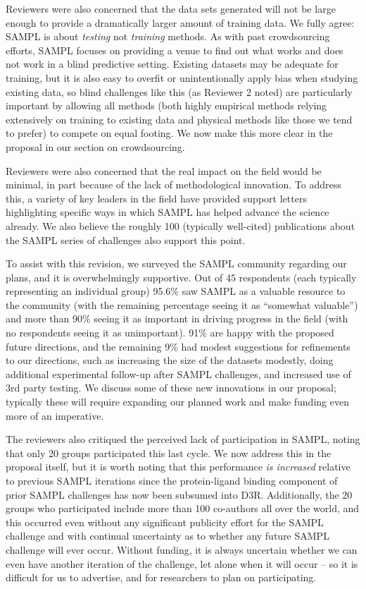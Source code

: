 \documentclass[11pt]{article}
\begin{document}
Reviewers were also concerned that the data sets generated will not be large enough to provide a dramatically larger amount of training data. 
We fully agree: SAMPL is about \emph{testing} not \emph{training} methods.
As with past crowdsourcing efforts, SAMPL focuses on providing a venue to find out what works and does not work in a blind predictive setting.
Existing datasets may be adequate for training, but it is also easy to overfit or unintentionally apply bias when studying existing data, so blind challenges like this (as Reviewer 2 noted) are particularly important by allowing all methods (both highly empirical methods relying extensively on training to existing data and physical methods like those we tend to prefer) to compete on equal footing.
We now make this more clear in the proposal in our section %
on crowdsourcing.

Reviewers were also concerned that the real impact on the field would be minimal, in part because of the lack of methodological innovation.
To address this, a variety of key leaders in the field have provided support letters highlighting specific ways in which SAMPL has helped advance the science already. 
We also believe the roughly 100 (typically well-cited) publications about the SAMPL series of challenges also support this point.

To assist with this revision, we surveyed the SAMPL community regarding our plans, and it is overwhelmingly supportive. 
Out of 45 respondents (each typically representing an individual group) 95.6\% saw SAMPL as a valuable resource to the community (with the remaining percentage seeing it as ``somewhat valuable'') and more than 90\% seeing it as important in driving progress in the field (with no respondents seeing it as unimportant). 91\% are happy with the proposed future directions, and the remaining 9\% had modest suggestions for refinements to our directions, such as increasing the size of the datasets modestly, doing additional experimental follow-up after SAMPL challenges, and increased use of 3rd party testing. 
We discuss some of these new innovations in our proposal; typically these will require expanding our planned work and make funding even more of an imperative.

The reviewers also critiqued the perceived lack of participation in SAMPL, noting that only 20 groups participated this last cycle. 
We now address this in the proposal itself, but it is worth noting that this performance \emph{is increased} relative to previous SAMPL iterations since the protein-ligand binding component of prior SAMPL challenges has now been subsumed into D3R. 
Additionally, the 20 groups who participated include more than 100 co-authors all over the world, and this occurred even without any significant publicity effort for the SAMPL challenge and with continual uncertainty as to whether any future SAMPL challenge will ever occur. 
Without funding, it is always uncertain whether we can even have another iteration of the challenge, let alone when it will occur -- so it is difficult for us to advertise, and for researchers to plan on participating. 
\end{document}
